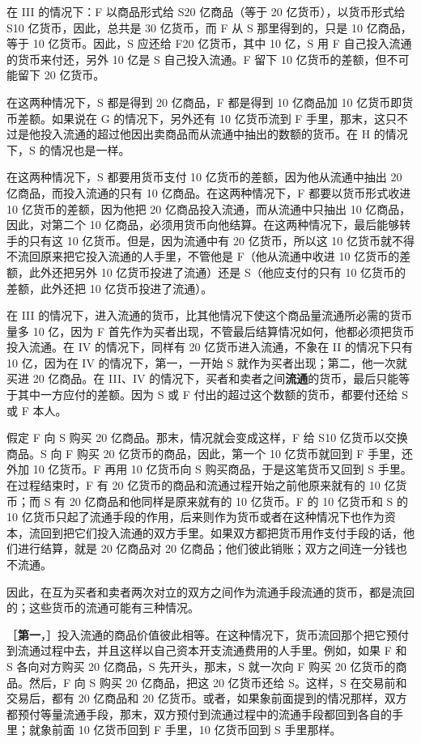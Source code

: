 在 III 的情况下：F 以商品形式给 S20 亿商品（等于 20 亿货币），以货币形式给 S10 亿货币，因此，总共是 30 亿货币，而 F 从 S 那里得到的，只是 10 亿商品，等于 10 亿货币。因此，S 应还给 F20 亿货币，其中 10 亿，S 用 F 自己投入流通的货币来付还，另外 10 亿是 S 自己投入流通。F 留下 10 亿货币的差额，但不可能留下 20 亿货币。

在这两种情况下，S 都是得到 20 亿商品，F 都是得到 10 亿商品加 10 亿货币即货币差额。如果说在 G 的情况下，另外还有 10 亿货币流到 F 手里，那末，这只不过是他投入流通的超过他因出卖商品而从流通中抽出的数额的货币。在 H 的情况下，S 的情况也是一样。

在这两种情况下，S 都要用货币支付 10 亿货币的差额，因为他从流通中抽出 20 亿商品，而投入流通的只有 10 亿商品。在这两种情况下，F 都要以货币形式收进 10 亿货币的差额，因为他把 20 亿商品投入流通，而从流通中只抽出 10 亿商品，因此，对第二个 10 亿商品，必须用货币向他结算。在这两种情况下，最后能够转手的只有这 10 亿货币。但是，因为流通中有 20 亿货币，所以这 10 亿货币就不得不流回原来把它投入流通的人手里，不管他是 F（他从流通中收进 10 亿货币的差额，此外还把另外 10 亿货币投进了流通）还是 S（他应支付的只有 10 亿货币的差额，此外还把 10 亿货币投进了流通）。

在 III 的情况下，进入流通的货币，比其他情况下使这个商品量流通所必需的货币量多 10 亿，因为 F 首先作为买者出现，不管最后结算情况如何，他都必须把货币投入流通。在 IV 的情况下，同样有 20 亿货币进入流通，不象在 II 的情况下只有 10 亿，因为在 IV 的情况下，第一，一开始 S 就作为买者出现；第二，他一次就买进 20 亿商品。在 III、IV 的情况下，买者和卖者之间\textbf{流通}的货币，最后只能等于其中一方应付的差额。因为 S 或 F 付出的超过这个数额的货币，都要付还给 S 或 F 本人。

假定 F 向 S 购买 20 亿商品。那末，情况就会变成这样，F 给 S10 亿货币以交换商品。S 向 F 购买 20 亿货币的商品，因此，第一个 10 亿货币就回到 F 手里，还外加 10 亿货币。F 再用 10 亿货币向 S 购买商品，于是这笔货币又回到 S 手里。在过程结束时，F 有 20 亿货币的商品和流通过程开始之前他原来就有的 10 亿货币；而 S 有 20 亿商品和他同样是原来就有的 10 亿货币。F 的 10 亿货币和 S 的 10 亿货币只起了流通手段的作用，后来则作为货币或者在这种情况下也作为资本，流回到把它们投入流通的双方手里。如果双方都把货币用作支付手段的话，他们进行结算，就是 20 亿商品对 20 亿商品；他们彼此销账；双方之间连一分钱也不流通。

因此，在互为买者和卖者两次对立的双方之间作为流通手段流通的货币，都是流回的；这些货币的流通可能有三种情况。

［\textbf{第一}，］投入流通的商品价值彼此相等。在这种情况下，货币流回那个把它预付到流通过程中去，并且这样以自己资本开支流通费用的人手里。例如，如果 F 和 S 各向对方购买 20 亿商品，S 先开头，那末，S 就一次向 F 购买 20 亿货币的商品。然后，F 向 S 购买 20 亿商品，把这 20 亿货币还给 S。这样，S 在交易前和交易后，都有 20 亿商品和 20 亿货币。或者，如果象前面提到的情况那样，双方都预付等量流通手段，那末，双方预付到流通过程中的流通手段都回到各自的手里；就象前面 10 亿货币回到 F 手里，10 亿货币回到 S 手里那样。

